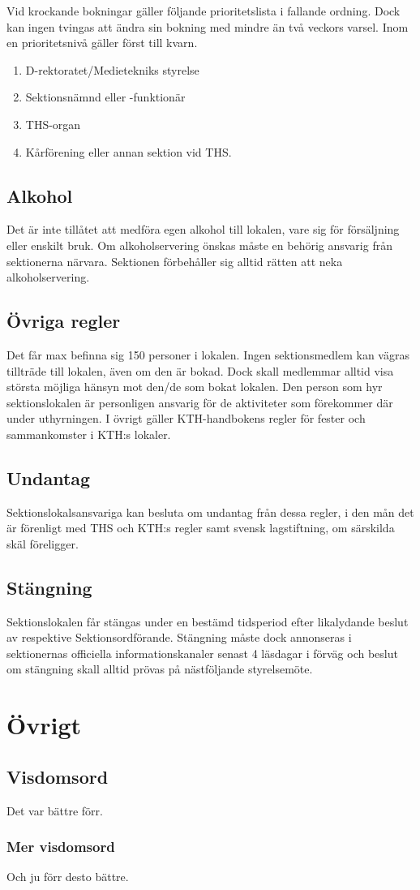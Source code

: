 \documentclass[a4paper,12pt]{article}
\begin{document}
Vid krockande bokningar gäller följande prioritetslista i fallande ordning. Dock kan
ingen tvingas att ändra sin bokning med mindre än två veckors varsel. Inom en prioritetsnivå gäller först till kvarn.

\begin{enumerate}
  \item D-rektoratet/Medietekniks styrelse
  \item Sektionsnämnd eller -funktionär
  \item THS-organ
  \item Kårförening eller annan sektion vid THS.
\end{enumerate}

\subsection{Alkohol}

Det är inte tillåtet att medföra egen alkohol till lokalen, vare sig för försäljning eller enskilt bruk. Om alkoholservering önskas måste en behörig ansvarig från sektionerna närvara. Sektionen förbehåller sig alltid rätten att neka alkoholservering.

\subsection{Övriga regler}

Det får max befinna sig 150 personer i lokalen. Ingen sektionsmedlem kan
vägras tillträde till lokalen, även om den är bokad. Dock skall medlemmar alltid visa största möjliga hänsyn mot den/de som bokat lokalen. Den person som hyr sektionslokalen är personligen ansvarig för de aktiviteter som förekommer där under uthyrningen. I övrigt gäller KTH-handbokens regler för
fester och sammankomster i KTH:s lokaler.

\subsection{Undantag}

Sektionslokalsansvariga kan besluta om undantag från dessa regler, i den mån det är förenligt med THS och KTH:s regler samt svensk lagstiftning, om särskilda skäl föreligger.

\subsection{Stängning}

Sektionslokalen får stängas under en bestämd tidsperiod efter likalydande beslut av respektive Sektionsordförande. Stängning måste dock annonseras i sektionernas officiella informationskanaler senast 4 läsdagar i förväg och beslut om stängning skall alltid prövas på nästföljande styrelsemöte.

\section{Övrigt}

\subsection{Visdomsord}

Det var bättre förr.

\subsubsection{Mer visdomsord}

Och ju förr desto bättre.
\end{document}
